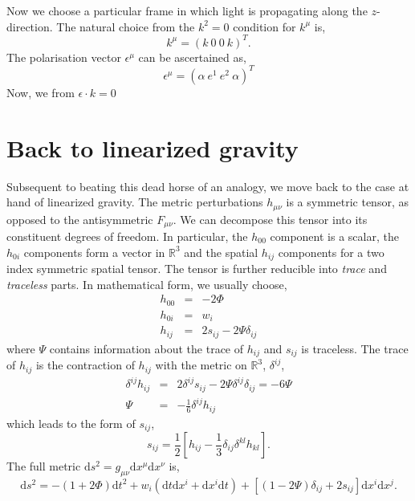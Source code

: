 Now we choose a particular frame in which light is propagating along the $z$-direction. The natural choice from the $k^2=0$ condition for $k^{\mu}$ is, 
\begin{equation}
    k^{\mu} = (k \ 0 \ 0 \ k)^T.
\end{equation}
The polarisation vector $\epsilon^{\mu}$ can be ascertained as, 
\begin{equation}
    \epsilon^{\mu} = (\alpha \ e^1 \ e^2 \ \alpha)^T
\end{equation}
Now, we from $\epsilon\cdot k = 0$
\section{Back to linearized gravity}
Subsequent to beating this dead horse of an analogy, we move back to the case at hand of linearized gravity. The metric perturbations $h_{\mu\nu}$ is a symmetric tensor, as opposed to the antisymmetric $F_{\mu\nu}$. We can decompose this tensor into its constituent degrees of freedom. In particular, the $h_{00}$ component is a scalar, the $h_{0i}$ components form a vector in $\mathbb{R}^3$ and the spatial $h_{ij}$ components for a two index symmetric spatial tensor. The tensor is further reducible into \textit{trace} and \textit{traceless} parts. In mathematical form, we usually choose, 
\begin{eqnarray}
    h_{00} &=& -2\Phi\\
    h_{0i} &=& w_{i}\\
    h_{ij} &=& 2s_{ij} - 2\Psi\delta_{ij}
\end{eqnarray}
where $\Psi$ contains information about the trace of $h_{ij}$ and $s_{ij}$ is traceless. The trace of $h_{ij}$ is the contraction of $h_{ij}$ with the metric on $\mathbb{R}^3$, $\delta^{ij}$, 
\begin{eqnarray}
    \delta^{ij}h_{ij} &=& 2\delta^{ij}s_{ij} -2\Psi\delta^{ij}\delta_{ij}=  - 6 \Psi\nonumber\\
    \Psi &=& -\frac{1}{6}\delta^{ij}h_{ij}
\end{eqnarray}
which leads to the form of $s_{ij}$,
\begin{equation}
    s_{ij} = \frac{1}{2}\left[h_{ij} - \frac{1}{3}\delta_{ij}\delta^{kl}h_{kl}\right].
\end{equation}
The full metric $\text{d}s^2 = g_{\mu\nu}\text{d}x^{\mu}\text{d}x^{\nu}$ is, 
\begin{equation}
    \text{d}s^2 = -(1+2\Phi)\text{d}t^2 + w_{i}(\text{d}t\text{d}x^i + \text{d}x^i\text{d}t) + [(1-2\Psi)\delta_{ij} + 2s_{ij}]\text{d}x^i\text{d}x^j.
\end{equation}
